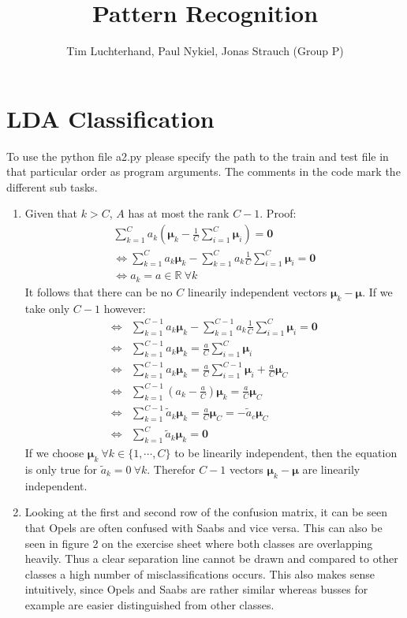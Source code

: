 \documentclass[DIN, pagenumber=false, fontsize=11pt, parskip=half]{scrartcl}
\title{Pattern Recognition}
\author{Tim Luchterhand, Paul Nykiel, Jonas Strauch (Group P)}
\newcommand{\R}[0]{\mathbb{R}}
\begin{document}
    \maketitle
    \section{LDA Classification}
    To use the python file a2.py please specify the path to the train and test file in that particular order as program arguments.
    The comments in the code mark the different sub tasks.
    \begin{enumerate}
        \item Given that $k > C$, $A$ has at most the rank $C-1$. Proof:
        \begin{align*}
            \sum_{k=1}^C a_k \left(\bm{\mu}_k - \frac{1}{C}\sum_{i=1}^C \bm{\mu}_i\right) = \mathbf{0} \\
            \Leftrightarrow \sum_{k=1}^C a_k \bm{\mu}_k - \sum_{k=1}^C a_k \frac{1}{C}\sum_{i=1}^C \bm{\mu}_i = \mathbf{0} \\
            \Leftrightarrow a_k = a \in \R \ \forall k
        \end{align*}
        It follows that there can be no $C$ linearily independent vectors $\bm{\mu}_k - \bm{\mu}$. If we take only $C-1$ however:
        \begin{align*}
            \Leftrightarrow &\sum_{k=1}^{C-1} a_k \bm{\mu}_k - \sum_{k=1}^{C-1} a_k \frac{1}{C}\sum_{i=1}^C \bm{\mu}_i = \mathbf{0} \\
            \Leftrightarrow &\sum_{k=1}^{C-1} a_k \bm{\mu}_k = \frac{a}{C} \sum_{i=1}^C \bm{\mu}_i \\
            \Leftrightarrow &\sum_{k=1}^{C-1} a_k \bm{\mu}_k = \frac{a}{C} \sum_{i=1}^{C-1} \bm{\mu}_i + \frac{a}{C} \bm{\mu}_C \\
            \Leftrightarrow &\sum_{k=1}^{C-1} \left(a_k - \frac{a}{C}\right) \bm{\mu}_k = \frac{a}{C} \bm{\mu}_C \\
            \Leftrightarrow &\sum_{k=1}^{C-1} \widetilde{a}_k \bm{\mu}_k = \frac{a}{C} \bm{\mu}_C = -\widetilde{a}_c \bm{\mu}_C \\
            \Leftrightarrow &\sum_{k=1}^{C} \widetilde{a}_k \bm{\mu}_k = \mathbf{0}
        \end{align*}
        If we choose $\bm{\mu}_k \ \forall k \in \{1, \cdots, C\}$ to be linearily independent, then the equation is only true for
        $\widetilde{a}_k = 0 \ \forall k$. Therefor $C-1$ vectors $\bm{\mu}_k - \bm{\mu}$ are linearily independent.
        \setcounter{enumi}{4}
        \item Looking at the first and second row of the confusion matrix, it can be seen that Opels are often confused with Saabs
        and vice versa. This can also be seen in figure 2 on the exercise sheet where both classes are overlapping heavily. Thus
        a clear separation line cannot be drawn and compared to other classes a high number of misclassifications occurs. This also
        makes sense intuitively, since Opels and Saabs are rather similar whereas busses for example are easier distinguished from
        other classes.
    \end{enumerate}
\end{document}
